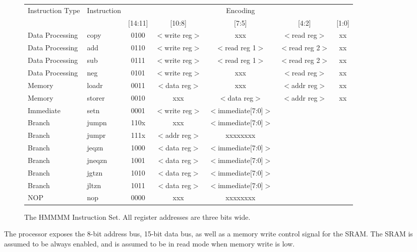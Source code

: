 \documentclass[12pt]{article}
\begin{document}
\begin{figure}[H]
    \centering
    \begin{adjustwidth}{-1cm}{}
    \begin{tabular}{ll|ccccc}
        Instruction Type & Instruction & && Encoding \\
                        &        & [14:11] & [10:8] & [7:5] & [4:2] & [1:0] \\
        Data Processing &  copy  & 0100&$<$write reg$>$&xxx&$<$read reg$>$&xx \\
        Data Processing &  add   & 0110&$<$write reg$>$&$<$read reg 1$>$&$<$read reg 2$>$&xx \\
        Data Processing &  sub   & 0111&$<$write reg$>$&$<$read reg 1$>$&$<$read reg 2$>$&xx \\
        Data Processing &  neg   & 0101&$<$write reg$>$&xxx&$<$read reg$>$&xx \\
        Memory          & loadr  & 0011&$<$data  reg$>$&xxx&$<$addr reg$>$&xx \\
        Memory          & storer & 0010&xxx&$<$data reg$>$&$<$addr reg$>$&xx \\
        Immediate       & setn   & 0001&$<$write reg$>$&$<$immediate[7:0]$>$ \\
        Branch          & jumpn  & 110x&xxx&$<$immediate[7:0]$>$ \\
        Branch          & jumpr  & 111x&$<$addr  reg$>$&xxxxxxxx \\
        Branch          & jeqzn  & 1000&$<$data  reg$>$&$<$immediate[7:0]$>$ \\
        Branch          & jneqzn & 1001&$<$data  reg$>$&$<$immediate[7:0]$>$ \\
        Branch          & jgtzn  & 1010&$<$data  reg$>$&$<$immediate[7:0]$>$ \\
        Branch          & jltzn  & 1011&$<$data  reg$>$&$<$immediate[7:0]$>$ \\
        NOP             & nop    & 0000&xxx&xxxxxxxx \\
    \end{tabular}
    \caption{The HMMMM Instruction Set. All register addresses are three bits wide.}
    \end{adjustwidth}
    \label{fig:isa}
\end{figure}

The processor exposes the 8-bit address bus, 15-bit data bus, as well as a memory write control signal for the SRAM. The SRAM is assumed to be always enabled, and is assumed to be in read mode when memory write is low.
\end{document}
